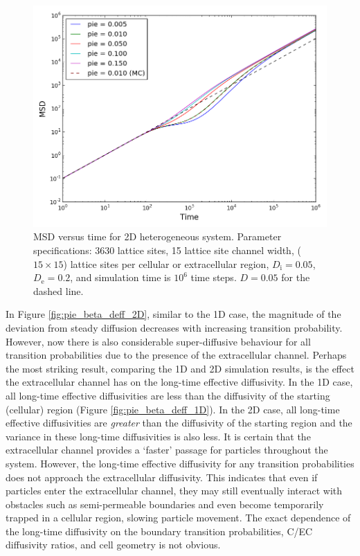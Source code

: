 	\begin{figure}[h!]
		\centering
		\includegraphics[width=1.0\linewidth]{../images/2D/pie_msd_2D}
		\caption[2D: MSD for varying boundary transition probabilities]{MSD versus time for 2D heterogeneous system. Parameter specifications: 3630 lattice sites, 15 lattice site channel width, ($ 15 \times 15 $) lattice sites per cellular or extracellular region, $ D_\textrm{i} = 0.05 $, $ D_\textrm{e} = 0.2 $, and simulation time is $ 10^6 $ time steps. $ D = 0.05 $ for the dashed line.}
		\label{fig:pie_msd_2D}
	\end{figure}
	
	In Figure \ref{fig:pie_beta_deff_2D}, similar to the 1D case, the magnitude of the deviation from steady diffusion decreases with increasing transition probability. However, now there is also considerable super-diffusive behaviour for all transition probabilities due to the presence of the extracellular channel. Perhaps the most striking result, comparing the 1D and  2D simulation results, is the effect the extracellular channel has on the long-time effective diffusivity. In the 1D case, all long-time effective diffusivities are less than the diffusivity of the starting (cellular) region (Figure \ref{fig:pie_beta_deff_1D}). In the 2D case, all long-time effective diffusivities are \emph{greater} than the diffusivity of the starting region and the variance in these long-time diffusivities is also less. It is certain that the extracellular channel provides a `faster' passage for particles throughout the system. However, the long-time effective diffusivity for any transition probabilities does not approach the extracellular diffusivity. This indicates that even if particles enter the extracellular channel, they may still eventually interact with obstacles such as semi-permeable boundaries and even become temporarily trapped in a cellular region, slowing particle movement. The exact dependence of the long-time diffusivity on the boundary transition probabilities, C/EC diffusivity ratios, and cell geometry is not obvious.
	

